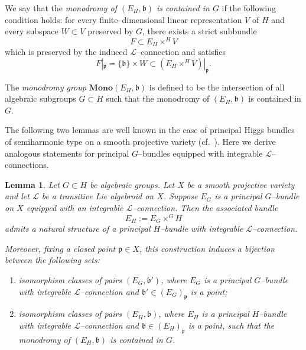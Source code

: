 \documentclass[12pt,reqno]{amsart}
\numberwithin{equation}{subsection}
\newtheorem{lem}[equation]{Lemma}
\theoremstyle{definition}
\theoremstyle{theorem}
\begin{document}
We say that the \emph{monodromy of $(E_H,\mathfrak{b})$ is contained in $G$}
if the following condition holds:
for every finite--dimensional linear representation $V$ of $H$ and every
subspace $W\subset V$ preserved by $G$, there exists a strict subbundle
\[
F \subset E_H\times^{H} V
\]
which is preserved by the induced $\mathcal{L}$--connection and satisfies
\[
F|_{\mathfrak{p}}=\{\mathfrak{b}\}\times W
\subset (E_H\times^{H} V)|_{\mathfrak{p}}.
\]

The \emph{monodromy group} $\mathbf{Mono}(E_H,\mathfrak{b})$ is defined to
be the intersection of all algebraic subgroups $G\subset H$ such that the
monodromy of $(E_H,\mathfrak{b})$ is contained in $G$.



The following two lemmas are well known in the case of principal Higgs
bundles of semiharmonic type on a smooth projective variety
(cf.~\cite[\S\,9, Lemmas~9.4 and~9.5]{CT.Simpson-1995}).
Here we derive analogous statements for principal $G$--bundles equipped
with integrable $\mathcal{L}$--connections.

\begin{lem}\label{monodromy related thm-for-PB with-L-connection}
	Let $G \subset H$ be algebraic groups. Let $X$ be a smooth projective variety
	and let $\mathcal{L}$ be a transitive Lie algebroid on $X$.
	Suppose $E_{G}$ is a principal $G$--bundle on $X$ equipped with an integrable
	$\mathcal{L}$--connection. Then the associated bundle
	\[
	E_{H} := E_{G} \times^{G} H
	\]
	admits a natural structure of a principal $H$--bundle with integrable
	$\mathcal{L}$--connection.
	
	Moreover, fixing a closed point $\mathfrak{p} \in X$, this construction induces
	a bijection between the following sets:
	\begin{enumerate}
		\item isomorphism classes of pairs $(E_{G},\mathfrak{b}')$, where $E_{G}$ is a
		principal $G$--bundle with integrable $\mathcal{L}$--connection and
		$\mathfrak{b}' \in (E_{G})_{\mathfrak{p}}$ is a point;
		
		\item isomorphism classes of pairs $(E_{H},\mathfrak{b})$, where $E_{H}$ is a
		principal $H$--bundle with integrable $\mathcal{L}$--connection and
		$\mathfrak{b} \in (E_{H})_{\mathfrak{p}}$ is a point, such that the monodromy of
		$(E_{H},\mathfrak{b})$ is contained in $G$.
	\end{enumerate}
\end{lem}
\end{document}
